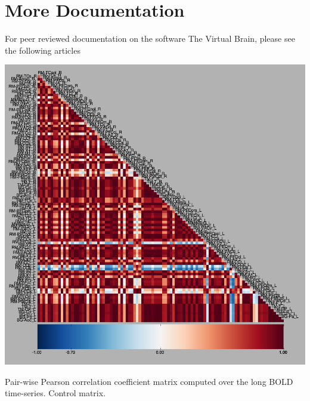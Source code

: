 \documentclass{tufte-handout}
\begin{document}
\section{More Documentation}\label{sec:more-doc}
For peer reviewed documentation on the software The Virtual Brain, please see the following articles \citep{Sanz-Leon_2013,  Woodman_2014}

\begin{marginfigure}%
  \includegraphics[width=\linewidth]{Handout_UI_ModellingStructuralLesions_bold_pearson_g2d_control.png}
  \caption{Pair-wise Pearson correlation coefficient matrix computed over the long BOLD time-series. Control matrix. }
  \label{fig:last}
  \end{marginfigure}
\end{document}
